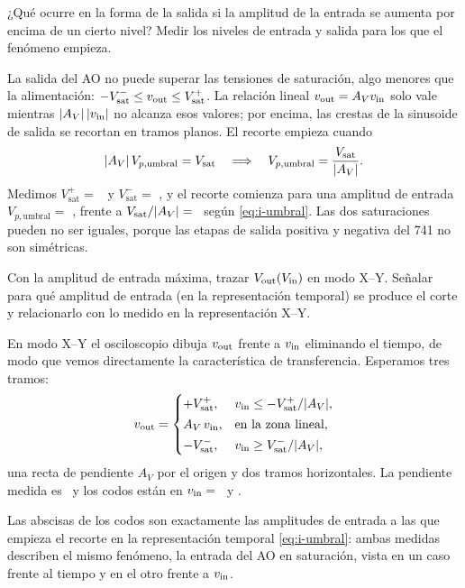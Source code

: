 \begin{pregunta}
¿Qué ocurre en la forma de la salida si la amplitud de la entrada se aumenta por encima de un cierto nivel?
Medir los niveles de entrada y salida para los que el fenómeno empieza.
\end{pregunta}

\begin{respuesta}
La salida del AO no puede superar las tensiones de saturación, algo menores que la alimentación:
$-V_{\mathrm{sat}}^{-}\le v_{\mathrm{out}}\le V_{\mathrm{sat}}^{+}$. La relación lineal $v_{\mathrm{out}}=A_Vv_{\mathrm{in}}$ solo vale mientras $\lvert A_V\rvert\,\lvert v_{\mathrm{in}}\rvert$
no alcanza esos valores; por encima, las crestas de la sinusoide de salida se recortan en tramos planos.
El recorte empieza cuando
\begin{equation}\label{eq:i-umbral}
  \lvert A_V\rvert\,V_{p,\mathrm{umbral}}=V_{\mathrm{sat}}\quad\Longrightarrow\quad V_{p,\mathrm{umbral}}=\frac{V_{\mathrm{sat}}}{\lvert A_V\rvert} .
\end{equation}
Medimos $V_{\mathrm{sat}}^{+}=$ \dato\ y $V_{\mathrm{sat}}^{-}=$ \dato, y el recorte comienza para una amplitud de entrada
$V_{p,\mathrm{umbral}}=$ \dato, frente a $V_{\mathrm{sat}}/\lvert A_V\rvert=$ \dato\ según \eqref{eq:i-umbral}. Las dos saturaciones pueden
no ser iguales, porque las etapas de salida positiva y negativa del 741 no son simétricas.
\end{respuesta}

\begin{pregunta}
Con la amplitud de entrada máxima, trazar $V_{\mathrm{out}}(V_{\mathrm{in}})$ en modo X--Y. Señalar para qué amplitud de entrada
(en la representación temporal) se produce el corte y relacionarlo con lo medido en la representación X--Y.
\end{pregunta}

\begin{respuesta}
En modo X--Y el osciloscopio dibuja $v_{\mathrm{out}}$ frente a $v_{\mathrm{in}}$ eliminando el tiempo, de modo que vemos
directamente la característica de transferencia. Esperamos tres tramos:
\begin{equation}\label{eq:i-caract}
  v_{\mathrm{out}}=\begin{cases}
    +V_{\mathrm{sat}}^{+}, & v_{\mathrm{in}}\le-V_{\mathrm{sat}}^{+}/\lvert A_V\rvert,\\[2pt]
    A_V\,v_{\mathrm{in}}, & \text{en la zona lineal},\\[2pt]
    -V_{\mathrm{sat}}^{-}, & v_{\mathrm{in}}\ge V_{\mathrm{sat}}^{-}/\lvert A_V\rvert,
  \end{cases}
\end{equation}
una recta de pendiente $A_V$ por el origen y dos tramos horizontales. La pendiente medida es \dato\ y los codos
están en $v_{\mathrm{in}}=$ \dato\ y \dato.
\begin{center}
\end{center}
Las abscisas de los codos son exactamente las amplitudes de entrada a las que empieza el recorte en la
representación temporal \eqref{eq:i-umbral}: ambas medidas describen el mismo fenómeno, la entrada del AO en
saturación, vista en un caso frente al tiempo y en el otro frente a $v_{\mathrm{in}}$.
\end{respuesta}

